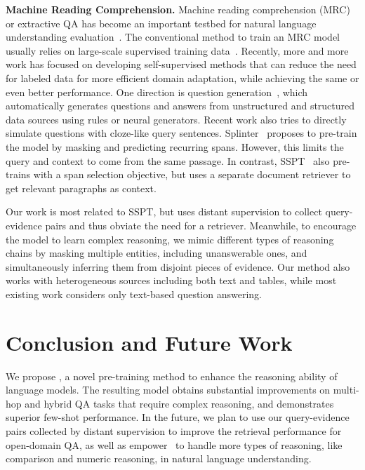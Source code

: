 \documentclass[11pt]{article}
\newcommand{\nop}[1]{}
\newcommand{\ours}[0]{\text{ReasonBERT}}
\begin{document}
\noindent\textbf{Machine Reading Comprehension.} Machine reading comprehension (MRC) {or extractive QA} has become an important testbed for natural language understanding evaluation~\cite{fisch-etal-2019-mrqa}.\nop{ In a typical MRC setting, the system needs to answer a question based on one or more provided pieces of evidence, which requires the system to explicitly reason over multiple contexts.} The conventional method to train an MRC model usually relies on large-scale supervised training data~\cite{chen-etal-2017-reading, Zhang2020RetrospectiveRF}. Recently, more and more work has focused on developing self-supervised methods that can reduce the need for labeled data for more efficient domain adaptation, while achieving the same or even better performance. One direction is question generation~\cite{pan-etal-2021-MQA-QG}, which automatically generates questions and answers from unstructured and structured data sources using rules or neural generators. Recent work also tries to directly simulate questions with cloze-like query sentences. Splinter~\cite{ram2021fewshot} proposes to pre-train the model by masking and predicting recurring spans. However, this limits the query and context to come from the same passage. In contrast, SSPT~\cite{glass-etal-2020-span} also pre-trains with a span selection objective, but uses a separate document retriever to get relevant paragraphs as context.

Our work is most related to SSPT, but uses distant supervision to collect query-evidence pairs and thus obviate the need for a retriever. Meanwhile, to encourage the model to learn complex reasoning, we mimic different types of reasoning chains by masking multiple entities, including unanswerable ones, and simultaneously inferring them from disjoint pieces of evidence. Our method also works with heterogeneous sources including both text and tables, while most existing work considers only text-based question answering.

 \section{Conclusion and Future Work}
We propose \ours, a novel pre-training method to enhance the reasoning ability of language models. The resulting model obtains substantial improvements on multi-hop and hybrid QA tasks that require complex reasoning, and demonstrates superior few-shot performance. In the future, we plan to use our query-evidence pairs collected by distant supervision to improve the retrieval performance for open-domain QA, as well as empower \ours\ to handle more types of reasoning, like comparison and numeric reasoning, in natural language understanding.  
\end{document}
